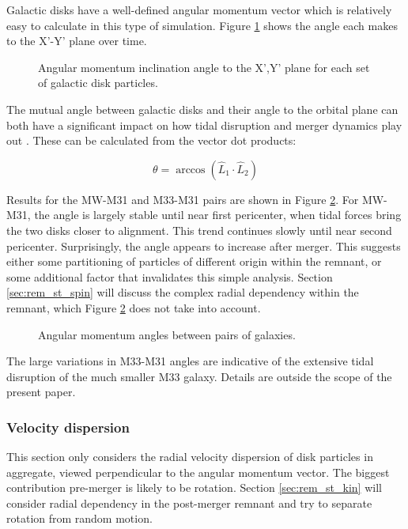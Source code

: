 \documentclass[twocolumn]{aastex63}
\begin{document}
Galactic disks have a well-defined angular momentum vector which is relatively easy to calculate in this type of simulation. Figure \ref{fig:inclinations_xy} shows the angle each makes to the X'-Y' plane over time.

\begin{figure}[ht!]
	\caption{Angular momentum inclination angle to the X',Y' plane for each set of galactic disk particles.
		\label{fig:inclinations_xy}}
\end{figure}

The mutual angle between galactic disks and their angle to the orbital plane can both have a significant impact on how tidal disruption and merger dynamics play out \citep{toomre_galactic_1972, barnes_dynamics_1992, privon_dynamical_2013, ji_lifetime_2014}. These can be calculated from the vector dot products:

\[ \theta = \arccos (\hat{L}_1 \cdot \hat{L}_2 ) \]

Results for the MW-M31 and M33-M31 pairs are shown in Figure \ref{fig:inclinations_mutual}. For MW-M31, the angle is largely stable until near first pericenter, when tidal forces bring the two disks closer to alignment. This trend continues slowly until near second pericenter. Surprisingly, the angle appears to increase after merger. This suggests either some partitioning of particles of different origin within the remnant, or some additional factor that invalidates this simple analysis. Section \ref{sec:rem_st_spin} will discuss the complex radial dependency within the remnant, which Figure \ref{fig:inclinations_mutual} does not take into account.

\begin{figure}[ht!]
	\caption{Angular momentum angles between pairs of galaxies.
		\label{fig:inclinations_mutual}}
\end{figure}

The large variations in M33-M31 angles are indicative of the extensive tidal disruption of the much smaller M33 galaxy. Details are outside the scope of the present paper.

\subsubsection{Velocity dispersion}

This section only considers the radial velocity dispersion of disk particles in aggregate, viewed perpendicular to the angular momentum vector. The biggest contribution pre-merger is likely to be rotation. Section \ref{sec:rem_st_kin} will consider radial dependency in the post-merger remnant and try to separate rotation from random motion.
\end{document}
